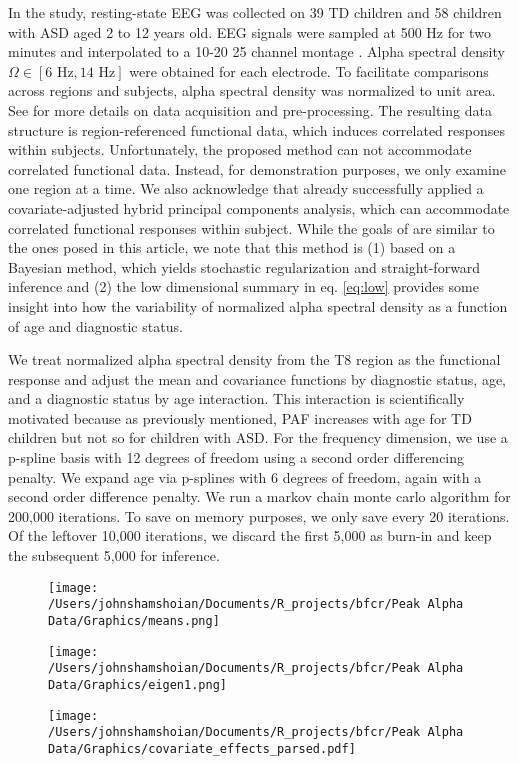 \documentclass[useAMS,referee,usenatbib]{biom}
\begin{document}
In the \citet{Dickinson2017} study, resting-state EEG was collected on 39 TD children and 58 children with ASD aged 2 to 12 years old.  EEG signals were sampled at 500 Hz for two minutes and interpolated to a 10-20 25 channel montage \citep{Jasper1958, Perrin1989}. Alpha spectral density  $\Omega \in [6 \text{ Hz}, 14 \text{ Hz}]$ were obtained for each electrode. To facilitate comparisons across regions and subjects, alpha spectral density was normalized to unit area. See \cite{Scheffler2019} for more details on data acquisition and pre-processing. The resulting data structure is region-referenced functional data, which induces correlated responses within subjects. Unfortunately, the proposed method can not accommodate correlated functional data. Instead, for demonstration purposes, we only examine one region at a time. We also acknowledge that \citet{Scheffler2020} already successfully applied a covariate-adjusted hybrid principal components analysis, which can accommodate correlated functional responses within subject. While the goals of \citet{Scheffler2020} are similar to the ones posed in this article, we note that this method is (1) based on a Bayesian method, which yields stochastic regularization and straight-forward inference and (2) the low dimensional summary in eq. \ref{eq:low} provides some insight into how the variability of normalized alpha spectral density as a function of age and diagnostic status. 

We treat normalized alpha spectral density from the T8 region as the functional response and adjust the mean and covariance functions by diagnostic status, age, and a diagnostic status by age interaction. This interaction is scientifically motivated because as previously mentioned, PAF increases with age for TD children but not so for children with ASD. For the frequency dimension, we use a p-spline basis with 12 degrees of freedom using a second order differencing penalty. We expand age via p-splines with 6 degrees of freedom, again with a second order difference penalty. We run a markov chain monte carlo algorithm for 200,000 iterations. To save on memory purposes, we only save every 20 iterations. Of the leftover 10,000 iterations, we discard the first 5,000 as burn-in and keep the subsequent 5,000 for inference.  

\begin{figure}
	\centering
	\texttt{[image: /Users/johnshamshoian/Documents/R\_projects/bfcr/Peak Alpha Data/Graphics/means.png]}
\end{figure}
\begin{figure}
	\centering
	\texttt{[image: /Users/johnshamshoian/Documents/R\_projects/bfcr/Peak Alpha Data/Graphics/eigen1.png]}
\end{figure}
\begin{figure}
	\centering
	\texttt{[image: /Users/johnshamshoian/Documents/R\_projects/bfcr/Peak Alpha Data/Graphics/covariate\_effects\_parsed.pdf]}
\end{figure}
\end{document}

